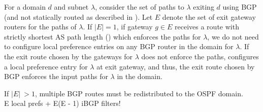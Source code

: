 For a domain $d$ and subnet $\lambda$, consider the set 
of paths to $\lambda$ exiting $d$ using BGP (and not statically
routed as described in ). Let $E$ denote the
set of exit gateway routers for the paths of $\lambda$. 
If $|E| = 1$, if gateway $g \in E$ receives a route with 
strictly shortest AS path length () 
which enforces the paths
for $\lambda$, we do not need to configure local preference
entries on any BGP router in the domain for $\lambda$. If
the exit route chosen by the gateways for $\lambda$ does not 
enforce the paths, \name configures a local preference entry
for $\lambda$ at exit gateway, and thus, the exit route chosen
by BGP enforces the input paths for $\lambda$ in the domain.

If $|E| ~> 1$, multiple BGP routes must be redistributed to 
the OSPF domain. \\
E local prefs + E(E - 1) iBGP filters!

